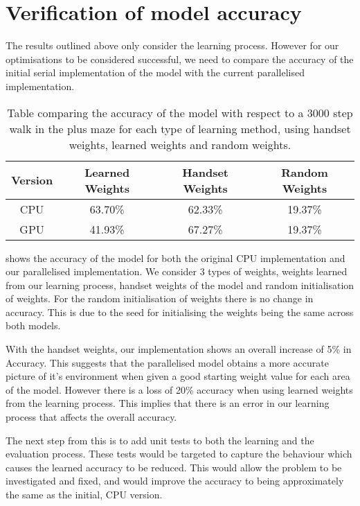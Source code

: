 \section{Verification of model accuracy}
The results outlined above only consider the learning process.
However for our optimisations to be considered successful, we need to compare the accuracy of the initial serial implementation of the model with the current parallelised implementation.


\begin{table}[h]
    \centering
    \begin{tabular}{|c|c|c|c|}
        \hline
        Version & Learned Weights   & Handset Weights   & Random Weights    \\\hline
        CPU     & 63.70\%           & 62.33\%           & 19.37\%           \\\hline
        GPU     & 41.93\%           & 67.27\%           & 19.37\%           \\\hline
    \end{tabular}
    \caption{
        Table comparing the accuracy of the model with respect to a 3000 step walk in the plus maze for each type of learning method, using handset weights, learned weights and random weights.
    }
    \label{tab:res_Metrics}
\end{table}

 shows the accuracy of the model for both the original CPU implementation and our parallelised implementation.
We consider 3 types of weights, weights learned from our learning process, handset weights of the model and random initialisation of weights.
For the random initialisation of weights there is no change in accuracy. 
This is due to the seed for initialising the weights being the same across both models.

With the handset weights, our implementation shows an overall increase of 5\% in Accuracy.
This suggests that the parallelised model obtains a more accurate picture of it's environment when given a good starting weight value for each area of the model.
However there is a loss of 20\% accuracy when using learned weights from the learning process.
This implies that there is an error in our learning process that affects the overall accuracy.

The next step from this is to add unit tests to both the learning and the evaluation process.
These tests would be targeted to capture the behaviour which causes the learned accuracy to be reduced.
This would allow the problem to be investigated and fixed, and would improve the accuracy to being approximately the same as the initial, CPU version.
